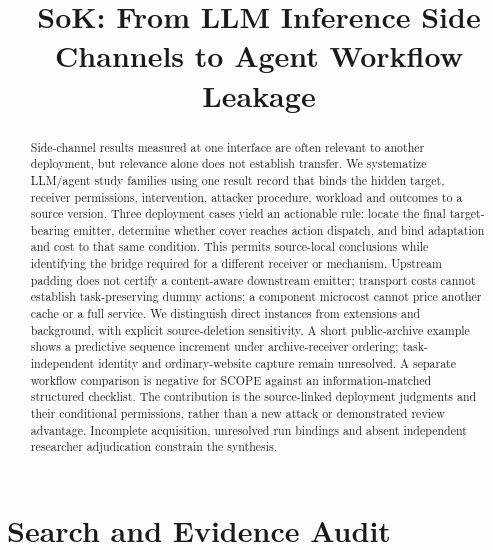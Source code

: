 \documentclass[conference,compsoc]{IEEEtran}
\title{SoK: From LLM Inference Side Channels to Agent Workflow Leakage}
\author{}
\begin{document}
\maketitle

\begin{abstract}
Side-channel results measured at one interface are often relevant to another deployment, but relevance alone does not establish transfer. We systematize \FinalN{} LLM/agent study families using one result record that binds the hidden target, receiver permissions, intervention, attacker procedure, workload and outcomes to a source version. Three deployment cases yield an actionable rule: locate the final target-bearing emitter, determine whether cover reaches action dispatch, and bind adaptation and cost to that same condition. This permits source-local conclusions while identifying the bridge required for a different receiver or mechanism. Upstream padding does not certify a content-aware downstream emitter; transport costs cannot establish task-preserving dummy actions; a component microcost cannot price another cache or a full service. We distinguish direct instances from extensions and background, with explicit source-deletion sensitivity. A short public-archive example shows a predictive sequence increment under archive-receiver ordering; task-independent identity and ordinary-website capture remain unresolved. A separate workflow comparison is negative for SCOPE against an information-matched structured checklist. The contribution is the source-linked deployment judgments and their conditional permissions, rather than a new attack or demonstrated review advantage. Incomplete acquisition, unresolved run bindings and absent independent researcher adjudication constrain the synthesis.
\end{abstract}













\clearpage
\appendices
\section{Search and Evidence Audit}
\label{app:search}








\end{document}

